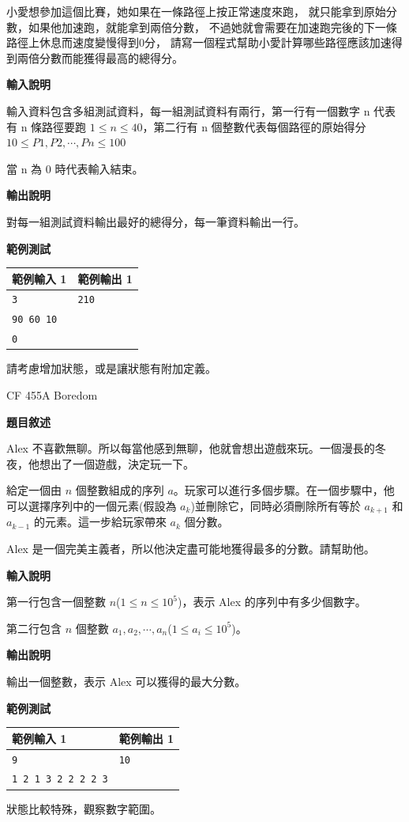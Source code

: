     小愛想參加這個比賽，她如果在一條路徑上按正常速度來跑，
    就只能拿到原始分數，如果他加速跑，就能拿到兩倍分數，
    不過她就會需要在加速跑完後的下一條路徑上休息而速度變慢得到0分，
    請寫一個程式幫助小愛計算哪些路徑應該加速得到兩倍分數而能獲得最高的總得分。

    \textbf{輸入說明}

    輸入資料包含多組測試資料，每一組測試資料有兩行，第一行有一個數字 n 代表有 n 條路徑要跑 $1 \le n \le 40$，第二行有 n 個整數代表每個路徑的原始得分 $10 \le P1, P2, \cdots , Pn \le 100$

    當 n 為 0 時代表輸入結束。

    \textbf{輸出說明}

    對每一組測試資料輸出最好的總得分，每一筆資料輸出一行。

    \textbf{範例測試}

    \begin{tabular}{|m{7cm}|m{7cm}|}
        \hline
        範例輸入 1 & 範例輸出 1 \\
        \hline
        \verb|3| & \verb|210| \\
        \verb|90 60 10| & \\
        \verb|0| & \\
        \hline
    \end{tabular}

    \begin{tip}
        請考慮增加狀態，或是讓狀態有附加定義。
    \end{tip}

    \problem CF 455A Boredom
    
    \textbf{題目敘述}

    Alex 不喜歡無聊。所以每當他感到無聊，他就會想出遊戲來玩。一個漫長的冬夜，他想出了一個遊戲，決定玩一下。

    給定一個由 $n$ 個整數組成的序列 $a$。玩家可以進行多個步驟。在一個步驟中，他可以選擇序列中的一個元素(假設為 $a_k$)並刪除它，同時必須刪除所有等於 $a_{k+1}$ 和 $a_{k-1}$ 的元素。這一步給玩家帶來 $a_k$ 個分數。

    Alex 是一個完美主義者，所以他決定盡可能地獲得最多的分數。請幫助他。

    \textbf{輸入說明}

    第一行包含一個整數 $n$($1 \le n \le 10^5$)，表示 Alex 的序列中有多少個數字。

    第二行包含 $n$ 個整數 $a_1, a_2, \cdots, a_n$($1 \le a_i \le 10^5$)。

    \textbf{輸出說明}

    輸出一個整數，表示 Alex 可以獲得的最大分數。

    \textbf{範例測試}

    \begin{tabular}{|m{7cm}|m{7cm}|}
        \hline
        範例輸入 1 & 範例輸出 1 \\
        \hline
        \verb|9| & \verb|10| \\
        \verb|1 2 1 3 2 2 2 2 3| & \\
        \hline
    \end{tabular}

    \begin{tip}
        狀態比較特殊，觀察數字範圍。
    \end{tip}